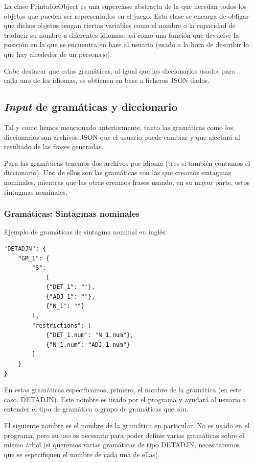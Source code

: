 La clase PrintableObject es una superclase abstracta de la que heredan todos los objetos que pueden ser representados en el juego. Esta clase se encarga de obligar que dichos objetos tengan ciertas variables como el nombre o la capacidad de traducir su nombre a diferentes idiomas, así como una función que devuelve la posición en la que se encuentra en base al usuario (usado a la hora de describir lo que hay alrededor de un personaje).

Cabe destacar que estas gramáticas, al igual que los diccionarios usados para cada uno de los idiomas, se obtienen en base a ficheros JSON dados.

\subsection{\textit{Input} de gramáticas y diccionario}

Tal y como hemos mencionado anteriormente, tanto las gramáticas como los diccionarios son archivos JSON que el usuario puede cambiar y que afectará al resultado de las frases generadas.

Para las gramáticas tenemos dos archivos por idioma (tres si también contamos el diccionario). Uno de ellos son las gramáticas con las que creamos sintagmas nominales, mientras que las otras creamos frases usando, en su mayor parte, estos sintagmas nominales.

\subsubsection{Gramáticas: Sintagmas nominales}

Ejemplo de gramáticas de sintagma nominal en inglés:

\begin{lstlisting}[style=json]
"DETADJN": {
    "GM_1": {
        "S": 
            [
            {"DET_1": ""}, 
            {"ADJ_1": ""}, 
            {"N_1": ""}
        ],
        "restrictions": [
            {"DET_1.num": "N_1.num"},
            {"N_1.num": "ADJ_1.num"}
        ]
    }
}
\end{lstlisting}

En estas gramáticas especificamos, primero, el nombre de la gramática (en este caso, DETADJN). Este nombre es usado por el programa y ayudará al usuario a entender el tipo de gramática o grupo de gramáticas que son.

El siguiente nombre es el nombre de la gramática en particular. No es usado en el programa, pero su uso es necesario para poder definir varias gramáticas sobre el mismo árbol (si queremos varias gramáticas de tipo DETADJN, necesitaremos que se especifiquen el nombre de cada una de ellas).

